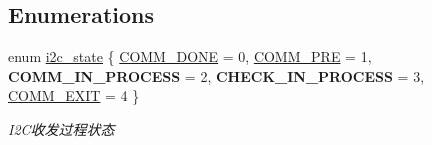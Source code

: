 \subsection*{\-Enumerations}
\begin{DoxyCompactItemize}
\item 
enum \hyperlink{group___i2_c_ga3acd3f8324118cb8c44f79b0fa24190a}{i2c\-\_\-state} \{ \*
\hyperlink{group___i2_c_gga3acd3f8324118cb8c44f79b0fa24190aa775c023b24ee56b90ca660f91522b78a}{\-C\-O\-M\-M\-\_\-\-D\-O\-N\-E} =  0, 
\hyperlink{group___i2_c_gga3acd3f8324118cb8c44f79b0fa24190aa671d1da07d0d895d5fdc1897b059bdc3}{\-C\-O\-M\-M\-\_\-\-P\-R\-E} =  1, 
{\bfseries \-C\-O\-M\-M\-\_\-\-I\-N\-\_\-\-P\-R\-O\-C\-E\-S\-S} =  2, 
{\bfseries \-C\-H\-E\-C\-K\-\_\-\-I\-N\-\_\-\-P\-R\-O\-C\-E\-S\-S} =  3, 
\*
\hyperlink{group___i2_c_gga3acd3f8324118cb8c44f79b0fa24190aa4a81f9df06f1e648593f415eba9eb1d0}{\-C\-O\-M\-M\-\_\-\-E\-X\-I\-T} =  4
 \}
\begin{DoxyCompactList}\small\item\em \-I2\-C收发过程状态 \end{DoxyCompactList}\end{DoxyCompactItemize}
